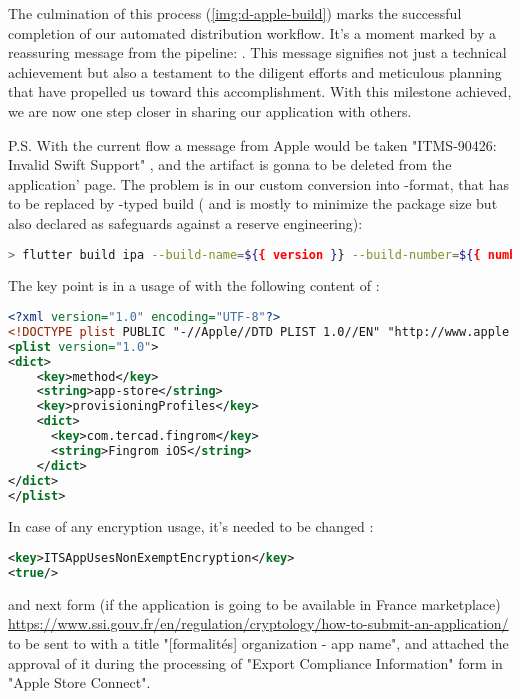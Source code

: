 \noindent The culmination of this process (\cref{img:d-apple-build}) marks the successful completion of our automated 
distribution workflow. It's a moment marked by a reassuring message from the pipeline: . 
This message signifies not just a technical achievement but also a testament to the diligent efforts and meticulous 
planning that have propelled us toward this accomplishment. With this milestone achieved, we are now one step closer 
in sharing our application with others.


\noindent P.S. With the current flow a message from Apple would be taken "ITMS-90426: Invalid Swift Support" ,
and the artifact is gonna to be deleted from the application' page. The problem is in our custom conversion into 
-format, that has to be replaced by -typed build ( and  is mostly to 
minimize the package size but also declared as safeguards against a reserve engineering):

\begin{lstlisting}[language=bash]
> flutter build ipa --build-name=${{ version }} --build-number=${{ number }}  --release --obfuscate --split-debug-info=build/ios/symbols --no-tree-shake-icons --export-options-plist ./ios/ExportOptions.plist
\end{lstlisting}

\noindent The key point is in a usage of  with the following content of :

\begin{lstlisting}[language=xml]
<?xml version="1.0" encoding="UTF-8"?>
<!DOCTYPE plist PUBLIC "-//Apple//DTD PLIST 1.0//EN" "http://www.apple.com/DTDs/PropertyList-1.0.dtd">
<plist version="1.0">
<dict>
    <key>method</key>
    <string>app-store</string>
    <key>provisioningProfiles</key>
    <dict>
      <key>com.tercad.fingrom</key>
      <string>Fingrom iOS</string>
    </dict>
</dict>
</plist>
\end{lstlisting}

In case of any encryption usage, it's needed to be changed :

\begin{lstlisting}[language=xml]
<key>ITSAppUsesNonExemptEncryption</key>
<true/>
\end{lstlisting}

\noindent and next form (if the application is going to be available in France marketplace) 
\href{https://www.ssi.gouv.fr/en/regulation/cryptology/how-to-submit-an-application/}{https://www.ssi.gouv.fr/en/regulation/cryptology/how-to-submit-an-application/}
to be sent to  with a title "[formalités] {organization} - {app name}", and attached the approval 
of it during the processing of "Export Compliance Information" form in "Apple Store Connect".
